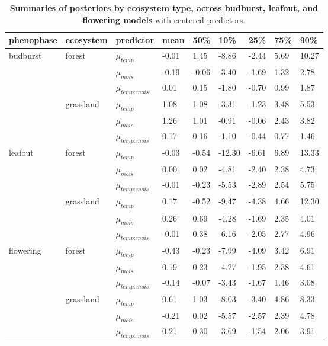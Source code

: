 \documentclass{article}
\begin{document}
\begin{table}[ht]
\centering
\caption{\textbf{Summaries of posteriors by ecosystem type, across budburst, leafout, and flowering models} with centered predictors.} 
\label{tab:ecos}
\begingroup\footnotesize
\begin{tabular}{|p{}|p{}|p{}|p{}p{}p{}p{}p{}p{}|}
 phenophase & ecosystem & predictor & mean & 50\% & 10\% & 25\% & 75\% & 90\% \\ 
  \hline
budburst & forest & $\mu_{temp}$ & -0.01 & 1.45 & -8.86 & -2.44 & 5.69 & 10.27 \\ 
   &  & $\mu_{mois}$ & -0.19 & -0.06 & -3.40 & -1.69 & 1.32 & 2.78 \\ 
   &  & $\mu_{temp:mois}$ & 0.01 & 0.15 & -1.80 & -0.70 & 0.99 & 1.87 \\ 
   & grassland & $\mu_{temp}$ & 1.08 & 1.08 & -3.31 & -1.23 & 3.48 & 5.53 \\ 
   &  & $\mu_{mois}$ & 1.26 & 1.01 & -0.91 & -0.06 & 2.43 & 3.82 \\ 
   &  & $\mu_{temp:mois}$ & 0.17 & 0.16 & -1.10 & -0.44 & 0.77 & 1.46 \\ 
   \hline
leafout & forest & $\mu_{temp}$ & -0.03 & -0.54 & -12.30 & -6.61 & 6.89 & 13.33 \\ 
   &  & $\mu_{mois}$ & 0.00 & 0.02 & -4.81 & -2.40 & 2.38 & 4.73 \\ 
   &  & $\mu_{temp:mois}$ & -0.01 & -0.23 & -5.53 & -2.89 & 2.54 & 5.75 \\ 
   & grassland & $\mu_{temp}$ & 0.17 & -0.52 & -9.47 & -4.38 & 4.66 & 12.30 \\ 
   &  & $\mu_{mois}$ & 0.26 & 0.69 & -4.28 & -1.69 & 2.35 & 4.01 \\ 
   &  & $\mu_{temp:mois}$ & -0.01 & 0.38 & -6.16 & -2.05 & 2.77 & 4.96 \\ 
   \hline
flowering & forest & $\mu_{temp}$ & -0.43 & -0.23 & -7.99 & -4.09 & 3.42 & 6.91 \\ 
   &  & $\mu_{mois}$ & 0.19 & 0.23 & -4.27 & -1.95 & 2.38 & 4.61 \\ 
   &  & $\mu_{temp:mois}$ & -0.14 & -0.07 & -3.43 & -1.67 & 1.46 & 3.08 \\ 
   & grassland & $\mu_{temp}$ & 0.61 & 1.03 & -8.03 & -3.40 & 4.86 & 8.33 \\ 
   &  & $\mu_{mois}$ & -0.21 & 0.02 & -5.57 & -2.57 & 2.39 & 4.78 \\ 
   &  & $\mu_{temp:mois}$ & 0.21 & 0.30 & -3.69 & -1.54 & 2.06 & 3.91 \\ 
   \hline
\end{tabular}
\endgroup
\end{table}
\clearpage
\end{document}
